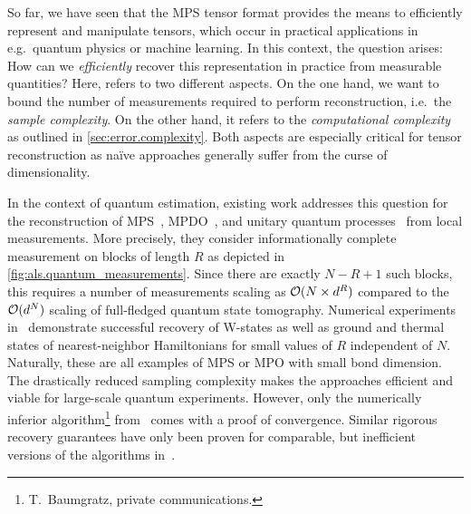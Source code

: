 So far, we have seen that the MPS tensor format provides the means to efficiently represent and manipulate tensors, which occur in practical applications in e.g.\ quantum physics or machine learning.
In this context, the question arises: How can we \emph{efficiently} recover this representation in practice from measurable quantities?
Here,  refers to two different aspects.
On the one hand, we want to bound the number of measurements required to perform reconstruction, i.e.\ the \emph{sample complexity}.
On the other hand, it refers to the \emph{computational complexity} as outlined in \cref{sec:error.complexity}.
Both aspects are especially critical for tensor reconstruction as na\"ive approaches generally suffer from the curse of dimensionality.

In the context of quantum estimation, existing work addresses this question for the reconstruction of MPS~\cite{Cramer_2010_Efficient}, MPDO~\cite{Baumgratz_2013_Scalable,Baumgratz_2013_Scalablea,Lanyon_2017_Efficient}, and unitary quantum processes~\cite{Holzaepfel_2014_Scalable} from local measurements.
More precisely, they consider informationally complete measurement on blocks of length $R$ as depicted in \cref{fig:als.quantum_measurements}.
Since there are exactly $N - R + 1$ such blocks, this requires a number of measurements scaling as ${\mathcal{O}}(N \times d^R)$ compared to the ${\mathcal{O}}(d^N)$ scaling of full-fledged quantum state tomography.
Numerical experiments in~\cite{Cramer_2010_Efficient,Baumgratz_2013_Scalable,Baumgratz_2013_Scalablea} demonstrate successful recovery of W-states as well as ground and thermal states of nearest-neighbor Hamiltonians for small values of $R$ independent of $N$.
Naturally, these are all examples of MPS or MPO with small bond dimension.
The drastically reduced sampling complexity makes the approaches efficient and viable for large-scale quantum experiments.
However, only the numerically inferior algorithm\footnote{%
  T.\ Baumgratz, private communications.
}
from~\cite{Baumgratz_2013_Scalable} comes with a proof of convergence.
Similar rigorous recovery guarantees have only been proven for comparable, but inefficient versions of the algorithms in~\cite{Cramer_2010_Efficient,Baumgratz_2013_Scalablea}.\\



